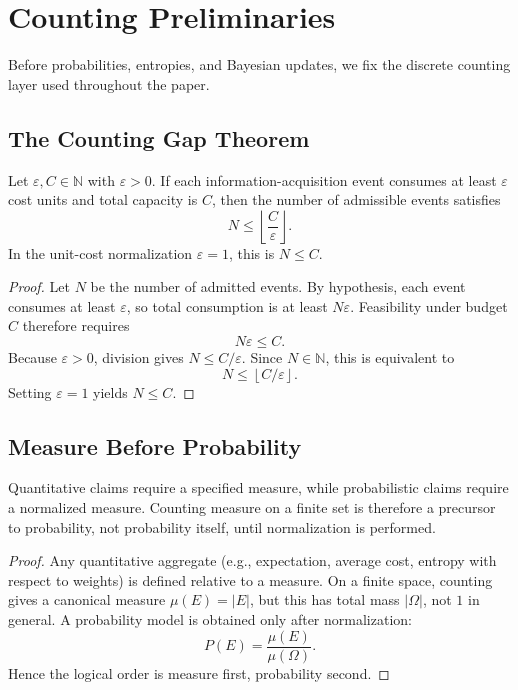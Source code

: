 \section{Counting Preliminaries}\label{sec:counting-preliminaries}

Before probabilities, entropies, and Bayesian updates, we fix the discrete counting layer used throughout the paper.

\subsection{The Counting Gap Theorem}

\begin{theorem}\label{thm:counting-gap}
Let $\varepsilon, C \in \mathbb{N}$ with $\varepsilon>0$. If each information-acquisition event consumes at least $\varepsilon$ cost units and total capacity is $C$, then the number of admissible events satisfies
\[
N \le \left\lfloor\frac{C}{\varepsilon}\right\rfloor.
\]
In the unit-cost normalization $\varepsilon=1$, this is $N\le C$.
\end{theorem}

\begin{proof}
Let $N$ be the number of admitted events. By hypothesis, each event consumes at least $\varepsilon$, so total consumption is at least $N\varepsilon$. Feasibility under budget $C$ therefore requires
\[
N\varepsilon \le C.
\]
Because $\varepsilon>0$, division gives $N \le C/\varepsilon$. Since $N\in\mathbb{N}$, this is equivalent to
\[
N \le \left\lfloor C/\varepsilon \right\rfloor.
\]
Setting $\varepsilon=1$ yields $N\le C$.
\end{proof}

\subsection{Measure Before Probability}

\begin{theorem}\label{thm:measure-prerequisite}
Quantitative claims require a specified measure, while probabilistic claims require a normalized measure. Counting measure on a finite set is therefore a precursor to probability, not probability itself, until normalization is performed.
\end{theorem}

\begin{proof}
Any quantitative aggregate (e.g., expectation, average cost, entropy with respect to weights) is defined relative to a measure. On a finite space, counting gives a canonical measure $\mu(E)=|E|$, but this has total mass $|\Omega|$, not $1$ in general. A probability model is obtained only after normalization:
\[
P(E)=\frac{\mu(E)}{\mu(\Omega)}.
\]
Hence the logical order is measure first, probability second.
\end{proof}


